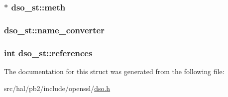 \subsubsection[{\texorpdfstring{meth}{meth}}]{$\ast$ dso\+\_\+st\+::meth}\hypertarget{structdso__st_a8a987f21e7657122da916308d8bf430f}{}\label{structdso__st_a8a987f21e7657122da916308d8bf430f}
\subsubsection[{\texorpdfstring{name\+\_\+converter}{name_converter}}]{ dso\+\_\+st\+::name\+\_\+converter}\hypertarget{structdso__st_ac326d621386b5835c2686269eab8c96b}{}\label{structdso__st_ac326d621386b5835c2686269eab8c96b}
\subsubsection[{\texorpdfstring{references}{references}}]{\setlength{\rightskip}{0pt plus 5cm}int dso\+\_\+st\+::references}\hypertarget{structdso__st_a6db2623dcc06fe53f8ae4f0487c4fbf5}{}\label{structdso__st_a6db2623dcc06fe53f8ae4f0487c4fbf5}


The documentation for this struct was generated from the following file\+:\begin{DoxyCompactItemize}
\item 
src/hal/pb2/include/openssl/\hyperlink{dso_8h}{dso.\+h}\end{DoxyCompactItemize}
